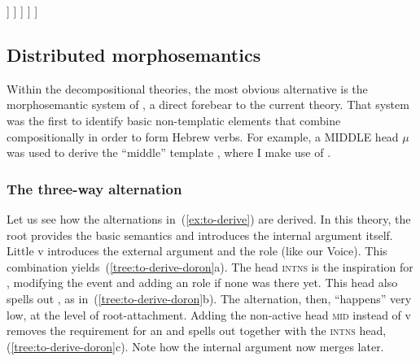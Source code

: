 \begin{exe}
\begin{xlist}
\begin{xlist}
\begin{exe}
\begin{xlist}
\begin{xlist}
\begin{exe}
\begin{xlist}
\begin{xlist}
\begin{exe}
\begin{exe}
\begin{xlist}
\begin{exe}
\begin{exe}
\begin{xlist}
\begin{exe}
\begin{exe}
\begin{exe}
\begin{exe}
\begin{exe}
\begin{xlist}
\begin{exe}
\begin{xlist}
\begin{exe}
\begin{exe}
\begin{xlist}
\begin{exe}
\begin{xlist}
\begin{exe}
\begin{exe}
\begin{exe}
\begin{xlist}
\begin{exe}
\begin{exe}
\begin{exe}
\begin{xlist}
\begin{exe}
\begin{xlist}
\begin{exe}
\begin{xlist}
\begin{exe}
\begin{xlist}
\begin{exe}
\begin{exe}
\begin{exe}
\begin{exe}
\begin{xlist}
\begin{exe}
\begin{xlist}
\begin{exe}
\begin{xlist}
\begin{exe}
\begin{xlist}
\begin{exe}
\begin{xlist}
\begin{exe}
\begin{xlist}
\begin{exe}
\begin{exe}
\begin{exe}
\begin{exe}
\begin{xlist}
\begin{exe}
\begin{xlist}
\begin{exe}
\begin{xlist}
\begin{exe}
\begin{exe}
\begin{xlist}
\begin{exe}
\begin{exe}
\begin{exe}
\begin{exe}
\begin{xlist}
\begin{xlist}
\begin{exe}
\begin{xlist}
\begin{exe}
\begin{exe}
\begin{exe}
\begin{xlist}
\begin{exe}
\begin{exe}
\begin{xlist}
\begin{exe}
\begin{exe}
\begin{exe}
\begin{xlist}
\begin{xlist}
\begin{exe}
\begin{xlist}
\begin{exe}
\begin{exe}
\begin{exe}
\begin{exe}
\begin{xlist}
\begin{exe}
\begin{xlist}
\begin{exe}
\begin{xlist}
\begin{exe}
\begin{exe}
\begin{exe}
\begin{exe}
\begin{exe}
\begin{exe}
\begin{xlist}
\begin{exe}
\begin{xlist}
\begin{exe}
\begin{xlist}
\begin{exe}
\begin{xlist}
\begin{exe}
\begin{xlist}
]
							]
						]
					]
				]			
 \z
\z 

	\subsection{Distributed morphosemantics \citep{doron03}} \label{vz:others:ed}
Within the decompositional theories, the most obvious alternative is the morphosemantic system of \cite{doron03}, a direct forebear to the current theory. That system was the first to identify basic non-templatic elements that combine compositionally in order to form Hebrew verbs. For example, a MIDDLE head $\mu$ was used to derive the ``middle'' template {\tnif}, where I make use of {\vz}.

		\subsubsection{The three-way alternation}
Let us see how the alternations in~(\ref{ex:to-derive}) are derived. In this theory, the root provides the basic semantics and introduces the internal argument itself. Little v introduces the external argument and the  role (like our Voice). This combination yields~(\ref{tree:to-derive-doron}a). The head \textsc{intns} is the inspiration for {\va}, modifying the event and adding an  role if none was there yet. This head also spells out {\tpie}, as in~(\ref{tree:to-derive-doron}b). The alternation, then, ``happens'' very low, at the level of root-attachment. Adding the non-active head \textsc{mid} instead of v removes the requirement for an  and spells out {\thit} together with the \textsc{intns} head, (\ref{tree:to-derive-doron}c). Note how the internal argument now merges later.
 
\end{xlist}
\end{exe}
\end{xlist}
\end{exe}
\end{xlist}
\end{exe}
\end{xlist}
\end{exe}
\end{xlist}
\end{exe}
\end{exe}
\end{exe}
\end{exe}
\end{exe}
\end{exe}
\end{xlist}
\end{exe}
\end{xlist}
\end{exe}
\end{xlist}
\end{exe}
\end{exe}
\end{exe}
\end{exe}
\end{xlist}
\end{exe}
\end{xlist}
\end{xlist}
\end{exe}
\end{exe}
\end{exe}
\end{xlist}
\end{exe}
\end{exe}
\end{xlist}
\end{exe}
\end{exe}
\end{exe}
\end{xlist}
\end{exe}
\end{xlist}
\end{xlist}
\end{exe}
\end{exe}
\end{exe}
\end{exe}
\end{xlist}
\end{exe}
\end{exe}
\end{xlist}
\end{exe}
\end{xlist}
\end{exe}
\end{xlist}
\end{exe}
\end{exe}
\end{exe}
\end{exe}
\end{xlist}
\end{exe}
\end{xlist}
\end{exe}
\end{xlist}
\end{exe}
\end{xlist}
\end{exe}
\end{xlist}
\end{exe}
\end{xlist}
\end{exe}
\end{exe}
\end{exe}
\end{exe}
\end{xlist}
\end{exe}
\end{xlist}
\end{exe}
\end{xlist}
\end{exe}
\end{xlist}
\end{exe}
\end{exe}
\end{exe}
\end{xlist}
\end{exe}
\end{exe}
\end{exe}
\end{xlist}
\end{exe}
\end{xlist}
\end{exe}
\end{exe}
\end{xlist}
\end{exe}
\end{xlist}
\end{exe}
\end{exe}
\end{exe}
\end{exe}
\end{exe}
\end{xlist}
\end{exe}
\end{exe}
\end{xlist}
\end{exe}
\end{exe}
\end{xlist}
\end{xlist}
\end{exe}
\end{xlist}
\end{xlist}
\end{exe}
\end{xlist}
\end{xlist}
\end{exe}
